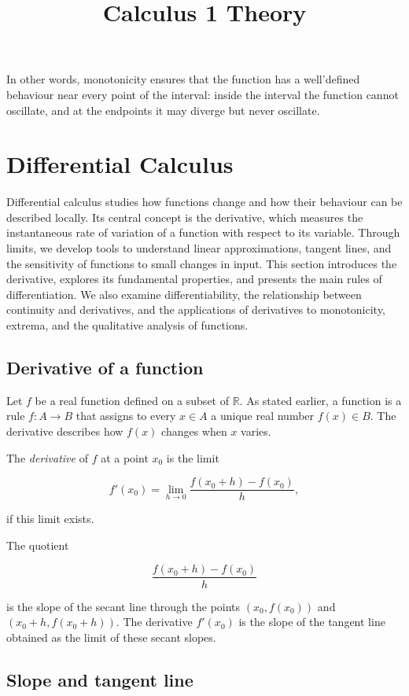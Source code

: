 \documentclass[11pt,a4paper]{article} \usepackage[T1]{fontenc}
\theoremstyle{plain} \newtheorem{theorem}{Theorem} \title{Calculus 1 Theory}
\begin{document}
In other words, monotonicity ensures that the function has a well’defined
behaviour near every point of the interval: inside the interval the function
cannot oscillate, and at the endpoints it may diverge but never oscillate.

\section{Differential Calculus}

Differential calculus studies how functions change and how their behaviour can
be described locally. Its central concept is the derivative, which measures the
instantaneous rate of variation of a function with respect to its variable.
Through limits, we develop tools to understand linear approximations, tangent
lines, and the sensitivity of functions to small changes in input. This section
introduces the derivative, explores its fundamental properties, and presents
the main rules of differentiation. We also examine differentiability, the
relationship between continuity and derivatives, and the applications of
derivatives to monotonicity, extrema, and the qualitative analysis of
functions.

\subsection {Derivative of a function}

Let $f$ be a real function defined on a subset of $\mathbb{R}$. As stated
earlier, a function is a rule $f:A\to B$ that assigns to every $x\in A$ a
unique real number $f(x)\in B$. The derivative describes how $f(x)$ changes
when $x$ varies.

\begin{definition}
[Derivative] The \emph{derivative} of $f$ at a point $x_0$ is the limit

\[
f'(x_0) = \lim_{h\to 0} \frac{f(x_0+h)-f(x_0)}{h},
\]

if this limit exists.
\end{definition}

The quotient

\[
\frac{f(x_0+h)-f(x_0)}{h}
\]

is the slope of the secant line through the points $(x_0,f(x_0))$ and
$(x_0+h,f(x_0+h))$. The derivative $f'(x_0)$ is the slope of the tangent line
obtained as the limit of these secant slopes.

\subsection {Slope and tangent line}
\end{document}
